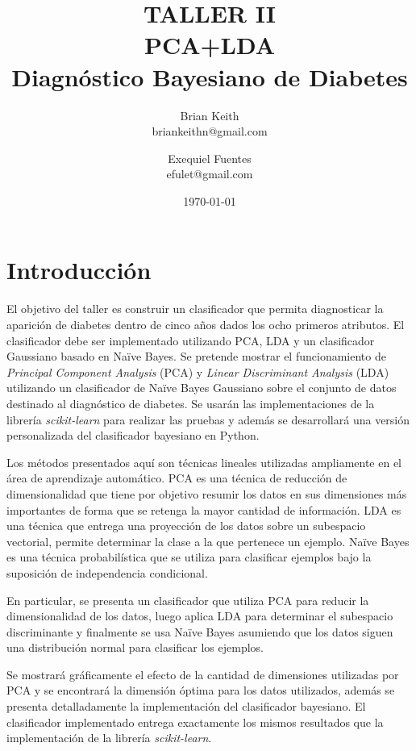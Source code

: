 \documentclass[letter, titlepage, 10pt]{article}
\title{TALLER II \\ PCA+LDA \\ Diagnóstico Bayesiano de Diabetes} %
\author{Brian Keith\\
  \small briankeithn@gmail.com\\
\and
  Exequiel Fuentes\\
  \small efulet@gmail.com\\
}
\date{\today}
\begin{document}
\maketitle %



\section{Introducción}
El objetivo del taller es construir un clasificador que permita diagnosticar la aparición de diabetes dentro de cinco años dados los ocho primeros atributos.  El clasificador debe ser implementado utilizando PCA, LDA y un clasificador Gaussiano basado en Naïve Bayes. Se pretende mostrar el funcionamiento de \textit{Principal Component Analysis} (PCA) y \textit{Linear Discriminant Analysis} (LDA) utilizando un clasificador de Naïve Bayes Gaussiano sobre el conjunto de datos destinado al diagnóstico de diabetes. Se usarán las implementaciones de la librería \textit{scikit-learn} para realizar las pruebas y además se desarrollará una versión personalizada del clasificador bayesiano en Python.

Los métodos presentados aquí son técnicas lineales utilizadas ampliamente en el área de aprendizaje automático. PCA es una técnica de reducción de dimensionalidad que tiene por objetivo resumir los datos en sus dimensiones más importantes de forma que se retenga la mayor cantidad de información. LDA es una técnica que entrega una proyección de los datos sobre un subespacio vectorial, permite determinar la clase a la que pertenece un ejemplo. Naïve Bayes es una técnica probabilística que se utiliza para clasificar ejemplos bajo la suposición de independencia condicional.

En particular, se presenta un clasificador que utiliza PCA para reducir la dimensionalidad de los datos, luego aplica LDA para determinar el subespacio discriminante y finalmente se usa Naïve Bayes asumiendo que los datos siguen una distribución normal para clasificar los ejemplos.

Se mostrará gráficamente el efecto de la cantidad de dimensiones utilizadas por PCA y se encontrará la dimensión óptima para los datos utilizados, además se presenta detalladamente la implementación del clasificador bayesiano. El clasificador implementado entrega exactamente los mismos resultados que la implementación de la librería \textit{scikit-learn}.
\end{document}
